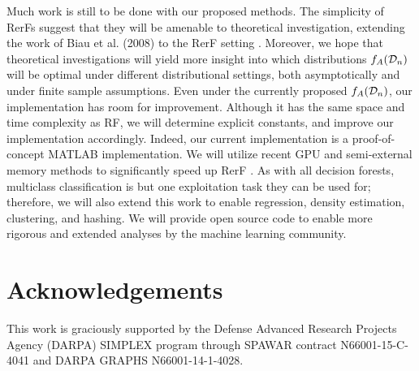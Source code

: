\documentclass[10pt]{article}
\begin{document}
Much work is still to be done with our proposed methods. The simplicity of RerFs suggest that they will be amenable to theoretical investigation, extending the work of Biau et al. (2008) to the RerF setting \cite{biau2008}. Moreover, we hope that theoretical investigations will yield more insight into which distributions $f_A(\mathcal{D}_n)$ will be optimal under different distributional settings, both asymptotically and under finite sample assumptions. Even under the currently proposed $f_A(\mathcal{D}_n)$, our implementation has room for improvement. Although it has the same space and time complexity as RF, we will determine explicit constants, and improve our implementation accordingly. Indeed, our current implementation is a proof-of-concept MATLAB implementation. We will utilize recent GPU and semi-external memory methods to significantly speed up RerF \cite{zheng15flashgraph}. As with all decision forests, multiclass classification is but one exploitation task they can be used for; therefore, we will also extend this work to enable regression, density estimation, clustering, and hashing. We will provide open source code to enable more rigorous and extended analyses by the machine learning community.

\section*{Acknowledgements}

This work is graciously supported by the Defense Advanced Research Projects Agency (DARPA) SIMPLEX program through SPAWAR contract N66001-15-C-4041 and DARPA GRAPHS N66001-14-1-4028.



\end{document}
